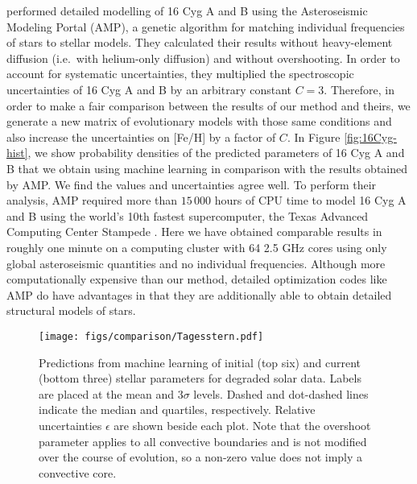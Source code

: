\documentclass[twocolumn,twocolappendix]{aastex6}
\newif\ifref
\newcommand{\mb}[1]{\ifref\boldmath\textbf{#1}\unboldmath\else #1\fi}
\begin{document}
\citet{2015ApJ...811L..37M} performed detailed modelling of 16 Cyg A and B using the Asteroseismic Modeling Portal (AMP), a genetic algorithm for matching individual frequencies of stars to stellar models. They calculated their results without heavy-element diffusion (i.e.\ with helium-only diffusion) and without overshooting. In order to account for systematic uncertainties, they multiplied the spectroscopic uncertainties of 16 Cyg A and B by an arbitrary constant $C=3$. Therefore, in order to make a fair comparison between the results of our method and theirs, we generate a new matrix of evolutionary models with those same conditions and also increase the uncertainties on [Fe/H] by a factor of $C$. In Figure \ref{fig:16Cyg-hist}, we show probability densities of the predicted parameters of 16 Cyg A and B that we obtain using machine learning in comparison with the results obtained by AMP. We find the values and uncertainties agree well. To perform their analysis, AMP required more than $15\,000$ hours of CPU time to model 16 Cyg A and B using the world's 10th fastest supercomputer, the Texas Advanced Computing Center Stampede \citep{TOP500}. Here we have obtained comparable results in roughly one minute \mb{on a computing cluster with 64 2.5 GHz cores} using only global asteroseismic \mb{quantities} and no individual frequencies. Although more computationally expensive than our method, detailed optimization codes like AMP do have advantages in that they are additionally able to obtain detailed structural models of stars. %

\begin{figure*}
    \centering
    \texttt{[image: figs/comparison/Tagesstern.pdf]}
    \caption{Predictions from machine learning of initial (top six) and current (bottom three) stellar parameters for degraded solar data. Labels are placed at the mean and 3$\sigma$ levels. \mb{Dashed and dot-dashed} lines indicate the median and quartiles\mb{, respectively}. Relative uncertainties $\epsilon$ are shown beside each plot. Note that the overshoot parameter applies to all convective boundaries and is not modified over the course of evolution, so a non-zero value does not imply a convective core. %
    \label{fig:corner} } 
\end{figure*}
\end{document}
